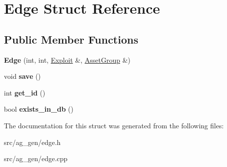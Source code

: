 \hypertarget{class_edge}{}\section{Edge Struct Reference}
\label{class_edge}
\subsection*{Public Member Functions}
\begin{DoxyCompactItemize}
\item 
\mbox{\label{class_edge_a080dd300d092b097555aea558412482c}} 
{\bfseries Edge} (int, int, \mbox{\hyperlink{class_exploit}{Exploit}} \&, \mbox{\hyperlink{class_asset_group}{Asset\+Group}} \&)
\item 
\mbox{\label{class_edge_a869e88b1119a70b136f26a186203f49e}} 
void {\bfseries save} ()
\item 
\mbox{\label{class_edge_a41de688b688ed7b033c683d0edd70d6f}} 
int {\bfseries get\+\_\+id} ()
\item 
\mbox{\label{class_edge_a1798bd9da33a54c876f4a349b311d97e}} 
bool {\bfseries exists\+\_\+in\+\_\+db} ()
\end{DoxyCompactItemize}


The documentation for this struct was generated from the following files\+:\begin{DoxyCompactItemize}
\item 
src/ag\+\_\+gen/edge.\+h\item 
src/ag\+\_\+gen/edge.\+cpp\end{DoxyCompactItemize}
